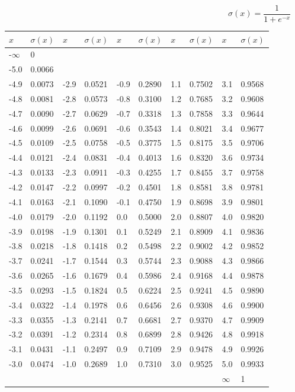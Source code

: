 \documentclass[11pt]{article}
\begin{document}
\begin{equation}\label{eq-logistic}
	\sigma(x) = \frac{1}{1 + e^{-x}}
\end{equation}

\begin{tabular}{ll|ll|ll|ll|ll}\label{tab-logistic}
$x$ & $\sigma(x)$  &  $x$ & $\sigma(x)$  &  $x$ & $\sigma(x)$  &  $x$ & $\sigma(x)$  &  $x$ & $\sigma(x)$\\
\hline
-$\infty$ & 0 &   & &   & &  & &  & \\
-5.0 & 0.0066 &   & &   & &  & &  & \\
-4.9 & 0.0073 &  -2.9 & 0.0521 &  -0.9 & 0.2890 &  1.1 & 0.7502 &  3.1 & 0.9568 \\
-4.8 & 0.0081 &  -2.8 & 0.0573 &  -0.8 & 0.3100 &  1.2 & 0.7685 &  3.2 & 0.9608 \\
-4.7 & 0.0090 &  -2.7 & 0.0629 &  -0.7 & 0.3318 &  1.3 & 0.7858 &  3.3 & 0.9644 \\
-4.6 & 0.0099 &  -2.6 & 0.0691 &  -0.6 & 0.3543 &  1.4 & 0.8021 &  3.4 & 0.9677 \\
-4.5 & 0.0109 &  -2.5 & 0.0758 &  -0.5 & 0.3775 &  1.5 & 0.8175 &  3.5 & 0.9706 \\
-4.4 & 0.0121 &  -2.4 & 0.0831 &  -0.4 & 0.4013 &  1.6 & 0.8320 &  3.6 & 0.9734 \\
-4.3 & 0.0133 &  -2.3 & 0.0911 &  -0.3 & 0.4255 &  1.7 & 0.8455 &  3.7 & 0.9758 \\
-4.2 & 0.0147 &  -2.2 & 0.0997 &  -0.2 & 0.4501 &  1.8 & 0.8581 &  3.8 & 0.9781 \\
-4.1 & 0.0163 &  -2.1 & 0.1090 &  -0.1 & 0.4750 &  1.9 & 0.8698 &  3.9 & 0.9801 \\
-4.0 & 0.0179 &  -2.0 & 0.1192 &   0.0 & 0.5000 &  2.0 & 0.8807 &  4.0 & 0.9820 \\
-3.9 & 0.0198 &  -1.9 & 0.1301 &   0.1 & 0.5249 &  2.1 & 0.8909 &  4.1 & 0.9836 \\
-3.8 & 0.0218 &  -1.8 & 0.1418 &   0.2 & 0.5498 &  2.2 & 0.9002 &  4.2 & 0.9852 \\
-3.7 & 0.0241 &  -1.7 & 0.1544 &   0.3 & 0.5744 &  2.3 & 0.9088 &  4.3 & 0.9866 \\
-3.6 & 0.0265 &  -1.6 & 0.1679 &   0.4 & 0.5986 &  2.4 & 0.9168 &  4.4 & 0.9878 \\
-3.5 & 0.0293 &  -1.5 & 0.1824 &   0.5 & 0.6224 &  2.5 & 0.9241 &  4.5 & 0.9890 \\
-3.4 & 0.0322 &  -1.4 & 0.1978 &   0.6 & 0.6456 &  2.6 & 0.9308 &  4.6 & 0.9900 \\
-3.3 & 0.0355 &  -1.3 & 0.2141 &   0.7 & 0.6681 &  2.7 & 0.9370 &  4.7 & 0.9909 \\
-3.2 & 0.0391 &  -1.2 & 0.2314 &   0.8 & 0.6899 &  2.8 & 0.9426 &  4.8 & 0.9918 \\
-3.1 & 0.0431 &  -1.1 & 0.2497 &   0.9 & 0.7109 &  2.9 & 0.9478 &  4.9 & 0.9926 \\
-3.0 & 0.0474 &  -1.0 & 0.2689 &   1.0 & 0.7310 &  3.0 & 0.9525 &  5.0 & 0.9933 \\
 & &   & &   & &  & & $\infty$ & 1 \\
\end{tabular}
\end{document}
